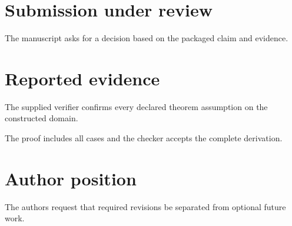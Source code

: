 \documentclass{article}
\begin{document}
\section{Submission under review}
The manuscript asks for a decision based on the packaged claim and evidence.
\section{Reported evidence}
The supplied verifier confirms every declared theorem assumption on the constructed domain.

The proof includes all cases and the checker accepts the complete derivation.
\section{Author position}
The authors request that required revisions be separated from optional future work.
\end{document}
